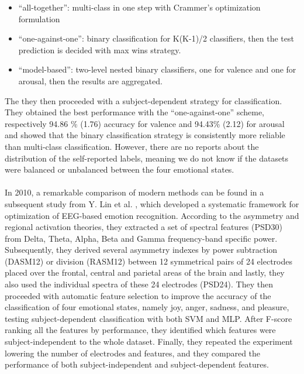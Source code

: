 \begin{itemize}
\item 	“all-together”: multi-class in one step with Crammer’s optimization formulation
\item 	“one-against-one”:  binary classification for K(K-1)/2 classifiers, then the test prediction is decided with max wins strategy.
\item 	“model-based”: two-level nested binary classifiers, one for valence and one for arousal, then the results are aggregated.
\end{itemize}
The they then proceeded with a subject-dependent strategy for classification. They obtained the best performance with the “one-against-one” scheme, respectively 94.86 \% (1.76) accuracy for valence and 94.43\% (2.12) for arousal and showed that the binary classification strategy is consistently more reliable than multi-class classification. However, there are no reports about the distribution of the self-reported labels, meaning we do not know if the datasets were balanced or unbalanced between the four emotional states.
\\
\\
In 2010, a remarkable comparison of modern methods can be found in a subsequent study from Y. Lin et al. \cite{lin_eeg-based_2010}, which developed a systematic framework for optimization of EEG-based emotion recognition. According to the asymmetry and regional activation theories, they extracted a set of spectral features (PSD30) from Delta, Theta, Alpha, Beta and Gamma frequency-band specific power. Subsequently, they derived several asymmetry indexes by power subtraction (DASM12) or division (RASM12) between 12 symmetrical pairs of 24 electrodes placed over the frontal, central and parietal areas of the brain and lastly, they also used the individual spectra of these 24 electrodes (PSD24). They then proceeded with automatic feature selection to improve the accuracy of the classification of four emotional states, namely joy, anger, sadness, and pleasure, testing subject-dependent classification with both \ac{SVM} and \ac{MLP}. After F-score ranking all the features by performance, they identified which features were subject-independent to the whole dataset. Finally, they repeated the experiment lowering the number of electrodes and features, and they compared the performance of both subject-independent and subject-dependent features.


